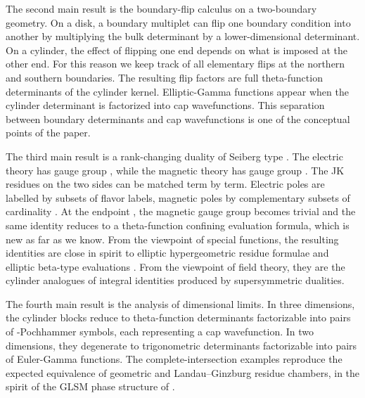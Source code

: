 \documentclass[11pt,a4paper]{article}
\makeatletter
\numberwithin{equation}{section}
\theoremstyle{plain}
\theoremstyle{definition}
\theoremstyle{remark}
\newcounter{mathrecordid}
\newcommand{\mathboxbegin}[1]{%
  \stepcounter{mathrecordid}%
  \immediate\write\mathrecords{\themathrecordid,#1}%
  \special{pdf:bann << /Type /Annot /Subtype /Link /Border [0 0 0]
    /MathBoxID \themathrecordid /F 2
    /A << /S /URI /URI (urn:mathbox:\themathrecordid) >> >>}}
\newcommand{\mathboxinlineplain}[1]{$#1$}
\newcommand{\mathboxinline}[1]{%
  $\mathboxbegin{inline}%
  \special{pdf:literal direct /MathBoxBegin\themathrecordid\space MP}%
  #1\special{pdf:literal direct /MathBoxEnd\themathrecordid\space MP}%
  \special{pdf:eann}$}
\newcommand{\recordmath}{%
  \ifmeasuring@\expandafter\mathboxinlineplain
  \else\expandafter\mathboxinline\fi}
\makeatother
\begin{document}
The second main result is the boundary-flip calculus on a two-boundary geometry.  On a disk, a boundary multiplet can flip one boundary condition into another by multiplying the bulk determinant by a lower-dimensional determinant.  On a cylinder, the effect of flipping one end depends on what is imposed at the other end.  For this reason we keep track of all elementary flips at the northern and southern boundaries. The resulting flip factors are full theta-function determinants of the cylinder kernel. Elliptic-Gamma functions appear when the cylinder determinant is factorized into cap wavefunctions.  This separation between boundary determinants and cap wavefunctions is one of the conceptual points of the paper.

The third main result is a rank-changing duality of Seiberg type \cite{Seiberg:1994pq}. The electric theory has gauge group \recordmath{U(N_c)}, while the magnetic theory has gauge group \recordmath{U(N_f-N_c)}. The JK residues on the two sides can be matched term by term. Electric poles are labelled by subsets \recordmath{\mathcal I} of \recordmath{N_c} flavor labels, magnetic poles by complementary subsets \recordmath{\mathcal J=\mathcal I^c} of cardinality \recordmath{N_f-N_c}. At the endpoint \recordmath{N_f=N_c}, the magnetic gauge group becomes trivial and the same identity reduces to a theta-function confining evaluation formula, which is new as far as we know. From the viewpoint of special functions, the resulting identities are close in spirit to elliptic hypergeometric residue formulae and elliptic beta-type evaluations \cite{Spiridonov:2001ig,Rains:2003}.  From the viewpoint of field theory, they are the cylinder analogues of integral  identities produced by supersymmetric dualities.

The fourth main result is the analysis of dimensional limits. In three dimensions, the cylinder blocks reduce to theta-function determinants factorizable into pairs of \recordmath{q}-Pochhammer symbols, each representing a cap wavefunction. In two dimensions, they degenerate to trigonometric determinants factorizable into pairs of Euler-Gamma functions. The complete-intersection examples reproduce the expected equivalence of geometric and Landau--Ginzburg residue chambers, in the spirit of the GLSM phase structure of \cite{Witten:1993yc}.  
\end{document}
